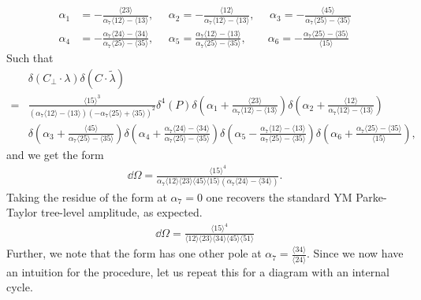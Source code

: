 \documentclass[letter,11pt]{article}
\newcommand{\ab}[1]{\langle #1 \rangle}
\begin{document}
\begin{equation}
	\begin{aligned}
\alpha_1&=-\frac{\ab{23}}{\alpha_7\ab{12}-\ab{13}},~~~~~~
\alpha_2=-\frac{\ab{12}}{\alpha_7\ab{12}-\ab{13}},~~~~~~
\alpha_3=-\frac{\ab{45}}{\alpha_7\ab{25}-\ab{35}}\\
\alpha_4&=-\frac{\alpha_7\ab{24}-\ab{34}}{\alpha_7\ab{25}-\ab{35}}
,~~~~~~
\alpha_5=\frac{\alpha_7\ab{12}-\ab{13}}{\alpha_7\ab{25}-\ab{35}}
,~~~~~~~~\,
\alpha_6=-\frac{\alpha_7\ab{25}-\ab{35}}{\ab{15}}
	\end{aligned}
\end{equation}
Such that
\begin{equation}
	\begin{aligned}
		&\delta(C_\perp\cdot \lambda)\delta(C\cdot\tilde \lambda)\\
		=&
		\frac{\ab{15}^3}{\left(\alpha_7\ab{12}-\ab{13}\right)
	\left(-\alpha_7\ab{25}+\ab{35}\right)^2	
	}\delta^4( P)
		\delta\left(\alpha_1+\frac{\ab{23}}{\alpha_7\ab{12}-\ab{13}}\right)
		\delta\left(\alpha_2+\frac{\ab{12}}{\alpha_7\ab{12}-\ab{13}}\right)\\&
		\delta\left(\alpha_3+\frac{\ab{45}}{\alpha_7\ab{25}-\ab{35}}\right)
		\delta\left(\alpha_4+\frac{\alpha_7\ab{24}-\ab{34}}{\alpha_7\ab{25}-\ab{35}}\right)
		\delta\left(\alpha_5-\frac{\alpha_7\ab{12}-\ab{13}}{\alpha_7\ab{25}-\ab{35}}\right)
		\delta\left(\alpha_6+\frac{\alpha_7\ab{25}-\ab{35}}{\ab{15}}\right),
	\end{aligned}
\end{equation}
and we get the form
\begin{equation}
	\begin{aligned}
	\dd \Omega=	\frac{\ab{15}^4}{\alpha_7 \ab{12}\ab{23}\ab{45}\ab{15}\left(\alpha_7\ab{24}-\ab{34}\right)}.
	\end{aligned}
\end{equation}
Taking the residue of the form at $\alpha_7=0$ one recovers the standard YM Parke-Taylor tree-level amplitude, as expected.
\begin{equation}
	\begin{aligned}
		\dd \Omega=	\frac{\ab{15}^4}{ \ab{12}\ab{23}\ab{34}\ab{45}\ab{51}}
	\end{aligned}
\end{equation}
Further, we note that the form has one other pole at $\alpha_7=\frac{\ab{34}}{\ab{24}}$. Since we now have an intuition for the procedure, let us repeat this for a diagram with an internal cycle.
\end{document}
